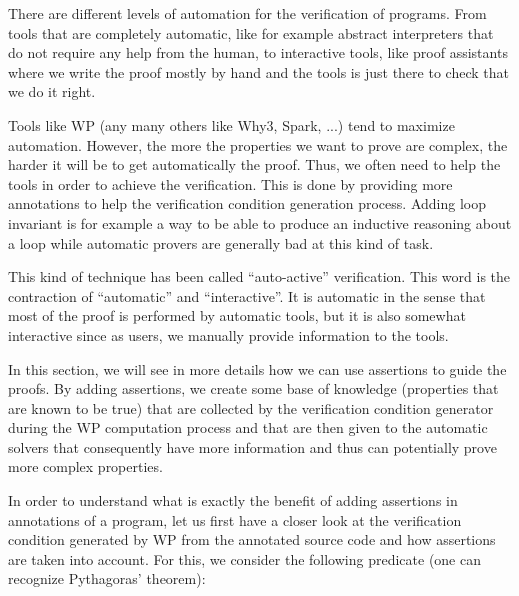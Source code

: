 There are different levels of automation for the verification of programs. From
tools that are completely automatic, like for example abstract interpreters that
do not require any help from the human, to interactive tools, like proof
assistants where we write the proof mostly by hand and the tools is just there
to check that we do it right.



Tools like WP (any many others like Why3, Spark, ...) tend to maximize
automation. However, the more the properties we want to prove are complex, the
harder it will be to get automatically the proof. Thus, we often need to help
the tools in order to achieve the verification. This is done by providing more
annotations to help the verification condition generation process. Adding loop
invariant is for example a way to be able to produce an inductive reasoning
about a loop while automatic provers are generally bad at this kind of task.



This kind of technique has been called ``auto-active'' verification. This word
is the contraction of ``automatic'' and ``interactive''. It is automatic in the
sense that most of the proof is performed by automatic tools, but it is also
somewhat interactive since as users, we manually provide information to the
tools.



In this section, we will see in more details how we can use assertions to guide
the proofs. By adding assertions, we create some base of knowledge (properties
that are known to be true) that are collected by the verification condition
generator during the WP computation process and that are then given to the
automatic solvers that consequently have more information and thus can
potentially prove more complex properties.






In order to understand what is exactly the benefit of adding assertions in
annotations of a program, let us first have a closer look at the verification
condition generated by WP from the annotated source code and how assertions are
taken into account. For this, we consider the following predicate (one can
recognize Pythagoras' theorem):






